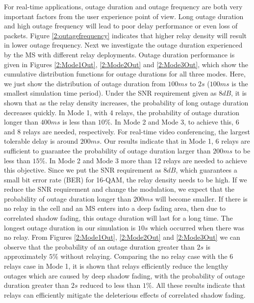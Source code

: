 \par For real-time applications, outage duration and outage frequency are both very important factors from the user experience point of view. Long outage duration and high outage frequency will lead to poor delay performance or even loss of packets. Figure \ref{2:outagefrequency} indicates that higher relay density will result in lower outage frequency. Next we investigate the outage duration experienced by the MS with different relay deployments. Outage duration performance is given in Figures \ref{2:Mode1Out}, \ref{2:Mode2Out} and \ref{2:Mode3Out}, which show the cumulative distribution functions for outage durations for all three modes. Here, we just show the distribution of outage duration from $100ms$ to $2s$ ($100ms$ is the smallest simulation time period). Under the SNR requirement given as $8dB$, it is shown that as the relay density increases, the probability of long outage duration decreases quickly. In Mode 1, with 4 relays, the probability of outage duration longer than $400ms$ is less than $10\%$. In Mode 2 and Mode 3, to achieve this, 6 and 8 relays are needed, respectively. For real-time video conferencing, the largest tolerable delay is around $200ms$. Our results indicate that in Mode 1, 6 relays are sufficient to guarantee the probability of outage duration larger than $200ms$ to be less than $15\%$. In Mode 2 and Mode 3 more than 12 relays are needed to achieve this objective. Since we put the SNR requirement as $8dB$, which guarantees a small bit error rate (BER) for 16-QAM, the relay density needs to be high. If we reduce the SNR requirement and change the modulation, we expect that the probability of outage duration longer than $200ms$ will become smaller. If there is no relay in the cell and an MS enters into a deep fading area, then due to correlated shadow fading, this outage duration will last for a long time. The longest outage duration in our simulation is $10s$ which occurred when there was no relay. From Figures \ref{2:Mode1Out}, \ref{2:Mode2Out} and \ref{2:Mode3Out} we can observe that the probability of an outage duration greater than $2s$ is approximately $5\%$ without relaying. Comparing the no relay case with the 6 relays case in Mode 1, it is shown that relays efficiently reduce the lengthy outages which are caused by deep shadow fading, with the probability of outage duration greater than $2s$ reduced to less than $1\%$. All these results indicate that relays can efficiently mitigate the deleterious effects of correlated shadow fading.

